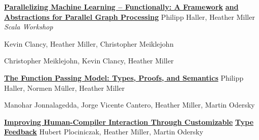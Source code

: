 \documentclass[9pt]{article}
\begin{document}
\noindent\href{http://infoscience.epfl.ch/record/165111}{\bf Parallelizing Machine Learning -- Functionally: A Framework}\vspace{-0.03in}
\newline\noindent\href{http://infoscience.epfl.ch/record/165111}{\bf and Abstractions for Parallel Graph Processing}
\newline\noindent Philipp Haller, Heather Miller
\newline\noindent\emph{Scala Workshop}
\bigskip

\pagebreak

\medskip



\dates{}
\newline\noindent Kevin Clancy, Heather Miller, Christopher Meiklejohn
\medskip

\dates{}
\newline\noindent Christopher Meiklejohn, Kevin Clancy, Heather Miller
\medskip

{}
 \medskip


\noindent\href{https://infoscience.epfl.ch/record/221395}{\bf The Function Passing Model: Types, Proofs, and Semantics}
\newline\noindent Philipp Haller, Normen M\"{u}ller, Heather Miller
\medskip

\newline\noindent Manohar Jonnalagedda, Jorge Vicente Cantero, Heather Miller, Martin Odersky
\medskip

\noindent\href{https://infoscience.epfl.ch/record/197948}{\bf Improving Human-Compiler Interaction Through Customizable} 
\newline\noindent\href{https://infoscience.epfl.ch/record/197948}{\bf Type Feedback}
\newline\noindent Hubert Plociniczak, Heather Miller, Martin Odersky
\medskip
\end{document}
